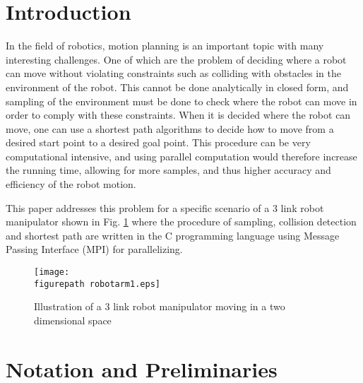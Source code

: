 
\newcommand{\figurepath}{./figures/}
\newcommand{\figurescale}{0.6}
\newcommand{\codepath}{../matlab/}





\section{Introduction}

In the field of robotics, motion planning is an important topic with many interesting challenges. One of which are the problem of deciding where a robot can move without violating constraints such as colliding with obstacles in the environment of the robot. This cannot be done analytically in closed form, and sampling of the environment must be done to check where the robot can move in order to comply with these constraints. When it is decided where the robot can move, one can use a shortest path algorithms to decide how to move from a desired start point to a desired goal point. This procedure can be very computational intensive, and using parallel computation would therefore increase the running time, allowing for more samples, and thus higher accuracy and efficiency of the robot motion.
\\  \par
This paper addresses this problem for a specific scenario of a 3 link robot manipulator shown in Fig. \ref{fig:robot1} where the procedure of sampling, collision detection and shortest path are written in the C programming language using Message Passing Interface (MPI) for parallelizing. 

\begin{figure}[h!] 
 \center 
 \texttt{[image: \\figurepath robotarm1.eps]}
 \caption{ Illustration of a 3 link robot manipulator moving in a two dimensional space \label{fig:robot1}}
 \end{figure}



\section{Notation and Preliminaries}

